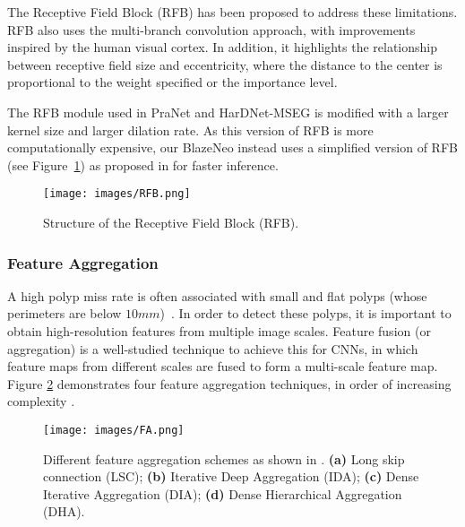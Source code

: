 \documentclass{ieeeaccess}
\newcommand{\ModelName}{BlazeNeo\xspace}
\begin{document}
The Receptive Field Block (RFB) \cite{liu2018receptive} has been proposed to address these limitations. RFB also uses the multi-branch convolution approach, with improvements inspired by the human visual cortex. In addition, it highlights the relationship between receptive field size and eccentricity, where the distance to the center is proportional to the weight specified or the importance level.

The RFB module used in PraNet \cite{fan2020pranet} and HarDNet-MSEG \cite{huang2021hardnet} is modified with a larger kernel size and larger dilation rate. As this version of RFB is more computationally expensive, our \ModelName instead uses a simplified version of RFB (see Figure~\ref{fig:rfb}) as proposed in \cite{liu2018receptive} for faster inference.

\begin{center}
    \begin{figure}[th]
        \begin{center}
            \texttt{[image: images/RFB.png]}
        \end{center}
        \caption{Structure of the Receptive Field Block (RFB).}
        \label{fig:rfb}
    \end{figure}
\end{center}

\subsubsection{Feature Aggregation}
A high polyp miss rate is often associated with small and flat polyps (whose perimeters are below $10 mm$)~\cite{kim2017miss}. In order to detect these polyps, it is important to obtain high-resolution features from multiple image scales. Feature fusion (or aggregation) is a well-studied technique to achieve this for CNNs, in which feature maps from different scales are fused to form a multi-scale feature map. Figure \ref{fig:fa} demonstrates four feature aggregation techniques, in order of increasing complexity \cite{zhang2020multi}.

\begin{center}
    \begin{figure}[th]
        \begin{center}
            \texttt{[image: images/FA.png]}
        \end{center}
        \caption{Different feature aggregation schemes as shown in \cite{zhang2020multi}. \textbf{(a)} Long skip connection (LSC); \textbf{(b)} Iterative Deep Aggregation (IDA); \textbf{(c)} Dense Iterative Aggregation (DIA); \textbf{(d)} Dense Hierarchical Aggregation (DHA).}
        \label{fig:fa}
    \end{figure}
\end{center}
\end{document}
